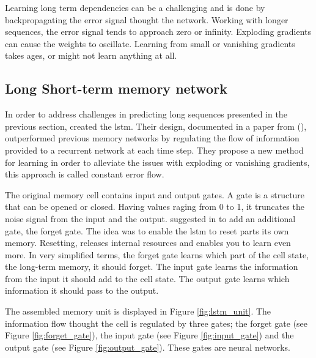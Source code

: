 Learning long term dependencies can be a challenging and is done by backpropagating the error signal thought the network. Working with longer sequences, the error signal tends to approach zero or infinity. Exploding gradients can cause the weights to oscillate. Learning from small or vanishing gradients takes ages, or might not learn anything at all. 

\subsection{Long Short-term memory network} \label{sec:lstm}
In order to address challenges in predicting long sequences presented in the previous section, \citeauthor{Hochreiter1997LongMemory} created the \acrfull{lstm}. Their design, documented in a paper from \citeyear{Hochreiter1997LongMemory} (\cite{Hochreiter1997LongMemory}), outperformed previous memory networks by regulating the flow of information provided to a recurrent network at each time step.
They propose a new method for learning %
in order to alleviate the issues with exploding or vanishing gradients, this approach is called constant error flow. 

The original memory cell contains input and output gates. A gate is a structure that can be opened or closed. Having values raging from 0 to 1, it truncates the noise signal from the input and the output. \citeauthor{lstm_learning_to_forget} suggested in \citeyear{lstm_learning_to_forget} to add an additional gate, the forget gate. The idea was to enable the \acrshort{lstm} to reset parts its own memory. Resetting, releases internal resources and enables you to learn even more. In very simplified terms, the forget gate learns which part of the cell state, the long-term memory, it should forget. The input gate learns the information from the input it should add to the cell state. The output gate learns which information it should pass to the output. 

The assembled memory unit is displayed in Figure \ref{fig:lstm_unit}. The information flow thought the cell is regulated by three gates; the forget gate (see Figure \ref{fig:forget_gate}), the input gate (see Figure \ref{fig:input_gate}) and the output gate (see Figure \ref{fig:output_gate}). These gates are neural networks. 

